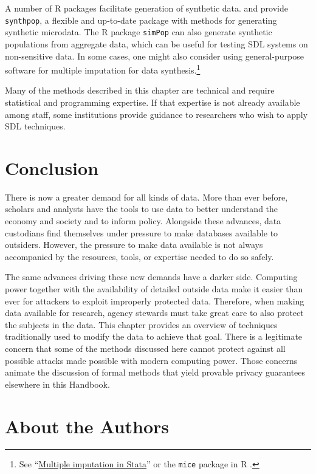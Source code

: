 A number of R packages facilitate generation of synthetic data. \citet{raab_practical_2016} and \citet{nowok_synthpop_2016} provide \texttt{synthpop}, a flexible and up-to-date package with methods for generating synthetic microdata. The R package \texttt{simPop} \citet{templ_simpop_2019} can also generate synthetic populations from aggregate data, which can be useful for testing SDL systems on non-sensitive data. In some cases, one might also consider using general-purpose software for multiple imputation for data synthesis.\footnote{See ``\href{https://stats.idre.ucla.edu/stata/seminars/mi_in_stata_pt1_new/}{Multiple imputation in Stata}'' or the \texttt{mice} package in R \citep{buuren_mice_2011}.}

Many of the methods described in this chapter are technical and require statistical and programming expertise. If that expertise is not already available among staff, some institutions provide guidance to researchers who wish to apply SDL techniques.

\hypertarget{conclusion}{%
\section{Conclusion}\label{conclusion}}

There is now a greater demand for all kinds of data. More than ever before, scholars and analysts have the tools to use data to better understand the economy and society and to inform policy. Alongside these advances, data custodians find themselves under pressure to make databases available to outsiders. However, the pressure to make data available is not always accompanied by the resources, tools, or expertise needed to do so safely.

The same advances driving these new demands have a darker side. Computing power together with the availability of detailed outside data make it easier than ever for attackers to exploit improperly protected data. Therefore, when making data available for research, agency stewards must take great care to also protect the subjects in the data. This chapter provides an overview of techniques traditionally used to modify the data to achieve that goal. There is a legitimate concern that some of the methods discussed here cannot protect against all possible attacks made possible with modern computing power. Those concerns animate the discussion of formal methods that yield provable privacy guarantees elsewhere in this Handbook.

\hypertarget{about-the-authors-1}{%
\section*{About the Authors}\label{about-the-authors-1}}


